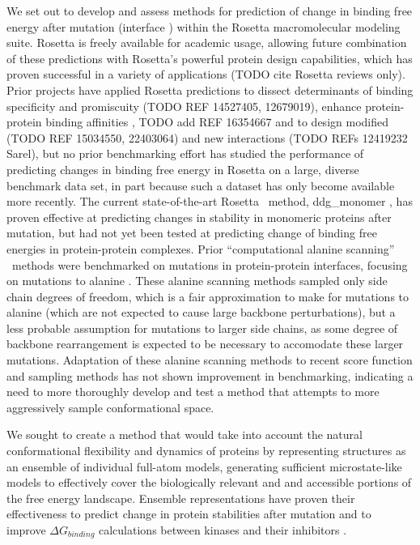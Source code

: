 We set out to develop and assess methods for prediction of change in binding free energy after mutation (interface \ddg) within the Rosetta macromolecular modeling suite. Rosetta is freely available for academic usage, allowing future combination of these predictions with Rosetta's powerful protein design capabilities, which has proven successful in a variety of applications (TODO cite Rosetta reviews only)\cite{kaufmann_practically_2010}.
Prior projects have applied Rosetta predictions to
dissect determinants of binding specificity and promiscuity (TODO REF 14527405, 12679019),
enhance protein-protein binding affinities \cite{sammond_structure-based_2007}, TODO add REF 16354667
and to design modified (TODO REF 15034550, 22403064)  and new interactions (TODO REFs 12419232 Sarel), but no prior benchmarking effort has studied the performance of predicting changes in binding free energy in Rosetta on a large, diverse benchmark data set, in part because such a dataset has only become available more recently.
The current state-of-the-art Rosetta \ddg\ method,  ddg\_monomer \cite{kellogg_role_2011}, has proven effective at predicting changes in stability in monomeric proteins after mutation, but had not yet been tested at predicting change of binding free energies in protein-protein complexes.
Prior ``computational alanine scanning'' \ddg\ methods were benchmarked on mutations in protein-protein interfaces, focusing on mutations to alanine \cite{kortemme_simple_2002,kortemme_computational_2004,conchuir_web_2015}.
These alanine scanning methods sampled only side chain degrees of freedom, which is a fair approximation to make for mutations to alanine (which are not expected to cause large backbone perturbations\cite{cunningham_high-resolution_1989}), but a less probable assumption for mutations to larger side chains, as some degree of backbone rearrangement is expected to be necessary to accomodate these larger mutations.
Adaptation of these alanine scanning methods to recent score function and sampling methods has not shown improvement in benchmarking\cite{conchuir_web_2015}, indicating a need to more thoroughly develop and test a method that attempts to more aggressively sample conformational space.

We sought to create a method that would take into account the natural conformational flexibility and dynamics of proteins by representing structures as an ensemble of individual full-atom models, generating sufficient microstate-like models to effectively cover the biologically relevant and and accessible portions of the free energy landscape.
Ensemble representations have proven their effectiveness to predict change in protein stabilities after mutation\cite{benedix_predicting_2009} and to improve $\Delta G_{binding}$ calculations between kinases and their inhibitors \cite{araki_effect_2016}.

